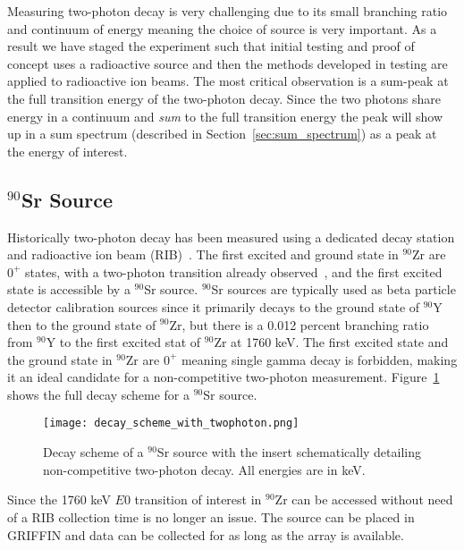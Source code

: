 \documentclass[cnatzke_thesis_proposal.tex]{subfiles}
\begin{document}
Measuring two-photon decay is very challenging due to its small branching ratio and continuum of energy meaning the choice of source is very important.
As a result we have staged the experiment such that initial testing and proof of concept uses a radioactive source and then the methods developed in testing are applied to radioactive ion beams. 
The most critical observation is a sum-peak at the full transition energy of the two-photon decay. 
Since the two photons share energy in a continuum and \textit{sum} to the full transition energy the peak will show up in a sum spectrum (described in Section~\ref{sec:sum_spectrum}) as a peak at the energy of interest.

\subsection{$^{90}$Sr Source}
Historically two-photon decay has been measured using a dedicated decay station and radioactive ion beam (RIB)~\cite{kramp_nuclear_1987}.
The first excited and ground state in $^{90}$Zr are $0^+$ states, with a two-photon transition already observed~\cite{schirmer_double_1984}, and the first excited state is accessible by a $^{90}$Sr source.
$^{90}$Sr sources are typically used as beta particle detector calibration sources since it primarily decays to the ground state of $^{90}$Y then to the ground state of $^{90}$Zr, but there is a 0.012 percent branching ratio from $^{90}$Y to the first excited stat of $^{90}$Zr at 1760 keV.
The first excited state and the ground state in $^{90}$Zr are $0^+$ meaning single gamma decay is forbidden, making it an ideal candidate for a non-competitive two-photon measurement.
Figure~\ref{fig:decay_scheme_with_twophoton} shows the full decay scheme for a $^{90}$Sr source.

\begin{figure}[H]
  \centering
  \texttt{[image: decay\_scheme\_with\_twophoton.png]}
  \caption{Decay scheme of a $^{90}$Sr source with the insert schematically detailing non-competitive two-photon decay. All energies are in keV.}
  \label{fig:decay_scheme_with_twophoton}
\end{figure}

Since the 1760 keV $E0$ transition of interest in $^{90}$Zr can be accessed without need of a RIB collection time is no longer an issue.
The source can be placed in GRIFFIN and data can be collected for as long as the array is available. 
\end{document}

